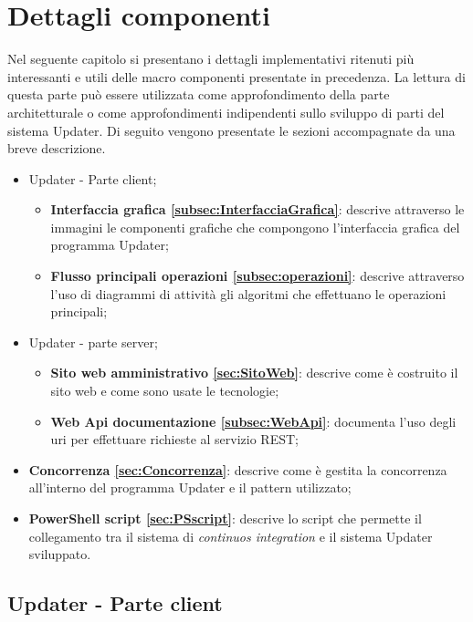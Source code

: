 \documentclass[../RelazioneFinale.tex]{subfiles}
\begin{document}
	\chapter{Dettagli componenti}
	\label{cap:Dettagli}
		
		Nel seguente capitolo si presentano i dettagli implementativi ritenuti più interessanti e utili delle macro componenti presentate in precedenza.
		La lettura di questa parte può essere utilizzata come approfondimento della parte architetturale o come approfondimenti indipendenti sullo sviluppo di parti del sistema Updater.
		Di seguito vengono presentate le sezioni accompagnate da una breve descrizione.
		\begin{itemize}
			\item Updater - Parte client;
			\begin{itemize}
				\item \textbf{Interfaccia grafica \ref{subsec:InterfacciaGrafica}}: descrive attraverso le immagini le componenti grafiche che compongono l'interfaccia grafica del programma Updater;
				\item \textbf{Flusso principali operazioni \ref{subsec:operazioni}}: descrive attraverso l'uso di diagrammi di attività gli algoritmi che effettuano le operazioni principali;
			\end{itemize}
			\item Updater - parte server;
			\begin{itemize}
				\item \textbf{Sito web amministrativo \ref{sec:SitoWeb}}: descrive come è costruito il sito web e come sono usate le tecnologie;
				\item \textbf{Web Api documentazione \ref{subsec:WebApi}}: documenta l'uso degli uri per effettuare richieste al servizio REST;
			\end{itemize}
			\item \textbf{Concorrenza \ref{sec:Concorrenza}}: descrive come è gestita la concorrenza all'interno del programma Updater e il pattern utilizzato;
			\item \textbf{PowerShell script \ref{sec:PSscript}}: descrive lo script che permette il collegamento tra il sistema di \emph{continuos integration} e il sistema Updater sviluppato.
		\end{itemize}
	


\newpage %
		
	\section{Updater - Parte client}
		
\end{document}
